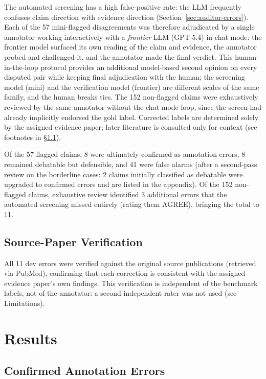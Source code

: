 \documentclass[11pt]{article}
\begin{document}
The automated screening has a high false-positive rate: the LLM frequently confuses claim direction with evidence direction (Section~\ref{sec:auditor-errors}).
Each of the 57 mini-flagged disagreements was therefore adjudicated by a single annotator working interactively with a \emph{frontier} LLM (GPT-5.4) in chat mode: the frontier model surfaced its own reading of the claim and evidence, the annotator probed and challenged it, and the annotator made the final verdict.
This human-in-the-loop protocol provides an additional model-based second opinion on every disputed pair while keeping final adjudication with the human; the screening model (mini) and the verification model (frontier) are different scales of the same family, and the human breaks ties.
The 152 non-flagged claims were exhaustively reviewed by the same annotator without the chat-mode loop, since the screen had already implicitly endorsed the gold label.
Corrected labels are determined solely by the assigned evidence paper; later literature is consulted only for context (see footnotes in \S\ref{sec:errors}).

Of the 57 flagged claims, 8 were ultimately confirmed as annotation errors, 8 remained debatable but defensible, and 41 were false alarms (after a second-pass review on the borderline cases: 2 claims initially classified as debatable were upgraded to confirmed errors and are listed in the appendix).
Of the 152 non-flagged claims, exhaustive review identified 3 additional errors that the automated screening missed entirely (rating them AGREE), bringing the total to 11.

\subsection{Source-Paper Verification}

All 11 dev errors were verified against the original source publications (retrieved via PubMed), confirming that each correction is consistent with the assigned evidence paper's own findings.
This verification is independent of the benchmark labels, not of the annotator: a second independent rater was not used (see Limitations).

\section{Results}

\subsection{Confirmed Annotation Errors}
\label{sec:errors}
\end{document}
